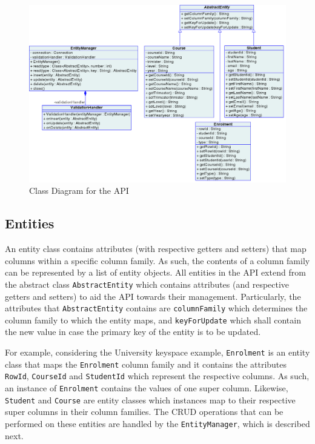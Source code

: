 \begin{figure}[h] 
	\centering
	\includegraphics[width=\textwidth]{./figure/Solutions/FinalClassDiagram.png}
	\caption{Class Diagram for the \ac{API}}\label{f:classDiagram}
\end{figure}


	\subsection{Entities} 
	An entity class contains attributes (with respective getters and setters) that
	map columns within a specific column family. As such, the contents of a
	column family can be represented by a list of entity objects. All entities in
	the \ac{API} extend from the abstract class \texttt{AbstractEntity} which
	contains attributes (and respective getters and setters) to
	aid the \ac{API} towards their management. Particularly, the attributes
	that \texttt{AbstractEntity} contains  are \texttt{columnFamily} which
	determines the column family to which the entity maps, and 
	\texttt{keyForUpdate} which shall contain the new value in case the primary key
	of the entity is to be updated.
	
	For example,  considering the University keyspace example, \texttt{Enrolment} 
	is an entity class that  maps the \texttt{Enrolment}  column family and
	it contains the attributes \texttt{RowId}, \texttt{CourseId} and
	\texttt{StudentId} which represent the respective columns. As such, an instance
	of \texttt{Enrolment} contains the values of one super column. Likewise,
	\texttt{Student} and \texttt{Course} are entity classes which instances 
	map to their respective super columns in their column families.
	The \ac{CRUD} operations that can be performed on these entities   are
	handled by the \texttt{EntityManager},  which is described next.
		
